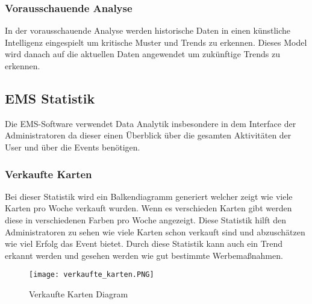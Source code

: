 			\subsubsection{Vorausschauende Analyse}
				In der vorausschauende Analyse werden historische Daten in einen künstliche Intelligenz eingespielt um kritische Muster und Trends zu erkennen. 
				Dieses Model wird danach auf die aktuellen Daten angewendet um zukünftige Trends zu erkennen. 
		\subsection{EMS Statistik}
			Die EMS-Software verwendet Data Analytik insbesondere in dem Interface der Administratoren da dieser einen Überblick über die gesamten Aktivitäten der User und über die Events benötigen.  			
			\subsubsection{Verkaufte Karten}
				Bei dieser Statistik wird ein Balkendiagramm generiert welcher zeigt wie viele Karten pro Woche verkauft wurden. Wenn es verschieden Karten gibt werden diese in verschiedenen Farben pro Woche angezeigt. 
				Diese Statistik hilft den Administratoren zu sehen wie viele Karten schon verkauft sind und abzuschätzen wie viel Erfolg das Event bietet. Durch diese Statistik kann auch ein Trend erkannt werden und gesehen werden wie gut bestimmte Werbemaßnahmen.	
				\begin{figure}[H]
					\centering
					\texttt{[image: verkaufte\_karten.PNG]}
					\caption{Verkaufte Karten Diagram}
				\end{figure}
